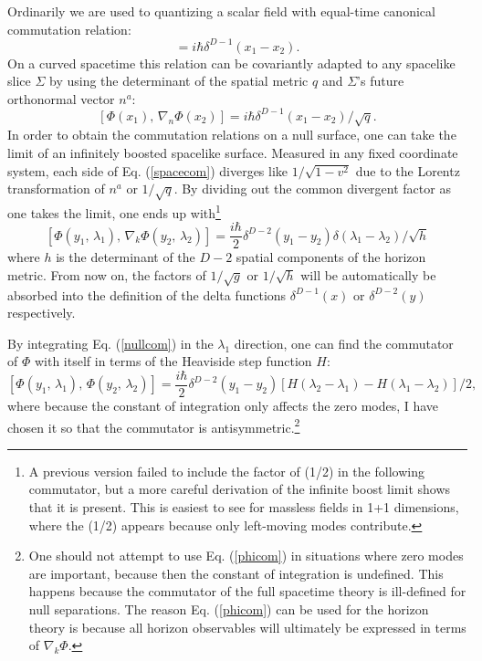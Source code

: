 \documentclass{article}
\begin{document}
Ordinarily we are used to quantizing a scalar field with equal-time canonical commutation relation:
\begin{equation}
[\Phi(x_1),\,\dot{\Phi}(x_2)] = i\hbar \delta^{D-1}(x_1 - x_2).
\end{equation}
On a curved spacetime this relation can be covariantly adapted to any spacelike slice $\Sigma$ by using the determinant of the spatial metric $q$ and $\Sigma$'s future orthonormal vector $n^a$:
\begin{equation}\label{spacecom}
[\Phi(x_1),\,\nabla_n \Phi(x_2)] = i\hbar \delta^{D-1}(x_1 - x_2)/ \sqrt{q}.
\end{equation}
In order to obtain the commutation relations on a null surface, one can take the limit of an infinitely boosted spacelike surface.  Measured in any fixed coordinate system, each side of Eq. (\ref{spacecom}) diverges like $1/\sqrt{1 - v^2}$ due to the Lorentz transformation of $n^a$ or $1/\sqrt{q}$.  By dividing out the common divergent factor as one takes the limit, one ends up with\footnote{A previous version failed to include the factor of (1/2) in the following commutator, but a more careful derivation of the infinite boost limit shows that it is present.  This is easiest to see for massless fields in 1+1 dimensions, where the (1/2) appears because only left-moving modes contribute.}
\begin{equation}\label{nullcom}
[\Phi(y_1,\,\lambda_1),\,\nabla_k \Phi(y_2,\,\lambda_2)] =
\frac{i\hbar}{2} \delta^{D-2}(y_1 - y_2) \delta(\lambda_1 - \lambda_2)/ \sqrt{h}
\end{equation}
where $h$ is the determinant of the $D - 2$ spatial components of the horizon metric.  From now on, the factors of $1/\sqrt{g}$ or $1/\sqrt{h}$ will be automatically be absorbed into the definition of the delta functions $\delta^{D-1}(x)$ or $\delta^{D-2}(y)$ respectively.

By integrating Eq. (\ref{nullcom}) in the $\lambda_1$ direction, one can find the commutator of $\Phi$ with itself in terms of the Heaviside step function $H$:
\begin{equation}\label{phicom}
[\Phi(y_1,\,\lambda_1),\,\Phi(y_2,\,\lambda_2)] =
\frac{i\hbar}{2} \delta^{D-2}(y_1 - y_2)
[H(\lambda_2 - \lambda_1) - H(\lambda_1 - \lambda_2)]/2,
\end{equation}
where because the constant of integration only affects the zero modes, I have chosen it so that the commutator is antisymmetric.\footnote{One should not attempt to use Eq. (\ref{phicom}) in situations where zero modes are important, because then the constant of integration is undefined. This happens because the commutator of the full spacetime theory is ill-defined for null separations.  The reason Eq. (\ref{phicom}) can be used for the horizon theory is because all horizon observables will ultimately be expressed in terms of $\nabla_k \Phi$.}
\end{document}
